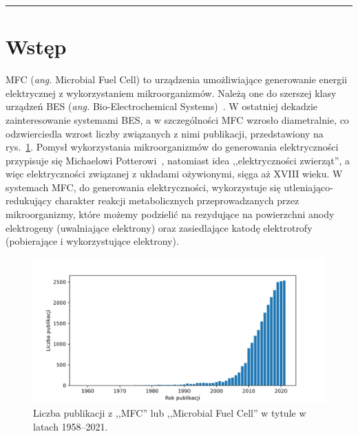 \documentclass[12pt, a4paper]{article}
\begin{document}


\newpage


\tableofcontents

\begin{abstract}
    \noindent
    \lipsum[1]
\end{abstract}

\rule{\textwidth}{0.4pt}

\begin{otherlanguage}{british}
    \begin{abstract}
        \noindent
        \lipsum[1] 
    \end{abstract}
\end{otherlanguage}

\section{Wstęp}\label{sec:intro}
MFC (\textit{ang.} Microbial Fuel Cell) to urządzenia umożliwiające generowanie energii elektrycznej z wykorzystaniem
mikroorganizmów.
Należą one do szerszej klasy urządzeń BES (\textit{ang.} Bio-Electrochemical Systems)~\cite{Santoro2017}.
W ostatniej dekadzie zainteresowanie systemami BES, a w szczególności MFC wzrosło diametralnie, co odzwierciedla wzrost
liczby związanych z nimi publikacji, przedstawiony na rys.~\ref{fig:1}.
Pomysł wykorzystania mikroorganizmów do generowania elektryczności przypisuje się Michaelowi Potterowi~\cite{Potter1911},
natomiast idea ,,elektryczności zwierząt'', a więc elektryczności związanej z układami ożywionymi, sięga aż XVIII wieku.
W systemach MFC, do generowania elektryczności, wykorzystuje się utleniająco-redukujący charakter reakcji metabolicznych
przeprowadzanych przez mikroorganizmy, które możemy podzielić na rezydujące na powierzchni anody elektrogeny
(uwalniające elektrony) oraz zasiedlające katodę elektrotrofy (pobierające i wykorzystujące elektrony).


\begin{figure}[!b]
    \centering
    \includegraphics[width=\textwidth]{figures/publications}
    \caption{Liczba publikacji z ,,MFC'' lub ,,Microbial Fuel Cell'' w tytule w latach 1958--2021.}
    \label{fig:1}
\end{figure}
\end{document}
